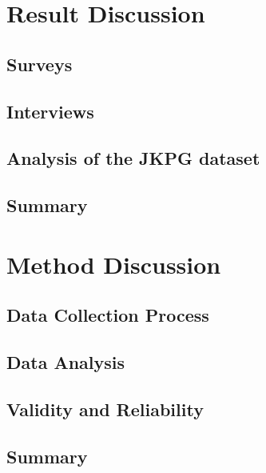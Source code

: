 \section{Result Discussion}

\subsection{Surveys}
\subsection{Interviews}
\subsection{Analysis of the JKPG dataset}
\subsection{Summary}

\section{Method Discussion}

\subsection{Data Collection Process}
\subsection{Data Analysis}
\subsection{Validity and Reliability}
\subsection{Summary}
